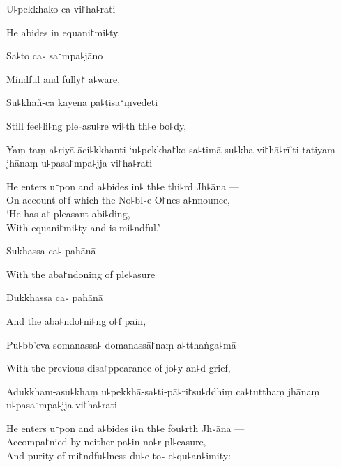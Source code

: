 U꜕pekkhako ca vi꜓ha꜕rati

\begin{english}
  He abides in equani꜓mi꜕ty,
\end{english}

Sa꜕to ca꜕ sa꜓mpa꜕jāno

\begin{english}
  Mindful and fully꜓ a꜕ware,
\end{english}

\enlargethispage{\baselineskip}

Su꜕khañ-ca kāyena pa꜕ṭisa꜓ṃvedeti

\begin{english}
  Still fee꜕li꜕ng ple꜕asu꜕re wi꜕th th꜕e bo꜕dy,
\end{english}

Yaṃ taṃ a꜕riyā āci꜕kkhanti `u꜕pekkha꜓ko sa꜕timā su꜕kha-vi꜓hā꜕rī'ti tatiyaṃ jhānaṃ u꜕pasa꜓mpa꜕jja vi꜓ha꜕rati

\begin{english}
  He enters u꜓pon and a꜕bides in꜕ th꜕e thi꜕rd Jh꜕āna ---\\
  On account o꜓f which the No꜕bl꜕e O꜓nes a꜕nnounce,\\
  `He has a꜓ pleasant abi꜕ding,\\
  With equani꜓mi꜕ty and is mi꜕ndful.'
\end{english}

Sukhassa ca꜕ pahānā

\begin{english}
  With the aba꜓ndoning of ple꜕asure
\end{english}

Dukkhassa ca꜕ pahānā

\begin{english}
  And the aba꜕ndo꜕ni꜕ng o꜕f pain,
\end{english}

Pu꜕bb'eva somanassa꜕ domanassā꜓naṃ a꜕tthaṅga꜕mā

\begin{english}
  With the previous disa꜓ppearance of jo꜕y an꜕d grief,
\end{english}

Adukkham-asu꜕khaṃ u꜕pekkhā-sa꜕ti-pā꜕ri꜓su꜕ddhiṃ ca꜕tutthaṃ jhānaṃ u꜕pasa꜓mpa꜕jja vi꜓ha꜕rati

\begin{english}
  He enters u꜓pon and a꜕bides i꜕n th꜕e fou꜕rth Jh꜕āna ---\\
  Accompa꜓nied by neither pa꜕in no꜕r-pl꜕easure,\\
  And purity of mi꜓ndfu꜕lness du꜕e to꜕ e꜕qu꜕an꜕imity:
\end{english}

